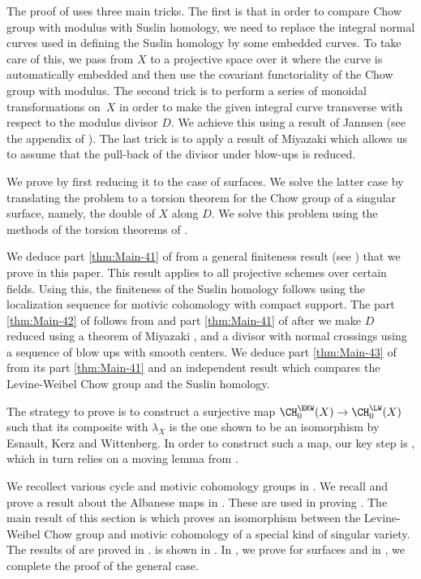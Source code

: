 The proof of  uses three main tricks. The first is
that in order to compare Chow group with modulus with Suslin homology,
we need to replace the integral normal curves used in defining the
Suslin homology by some embedded curves. To take care of this,
we pass from $X$ to a projective space over it where the curve is automatically
embedded and then use the covariant functoriality of the Chow group with
modulus. The second trick is to perform a series of monoidal transformations on~$X$ in order to make the given integral curve transverse with respect to
the modulus divisor $D$. We achieve this using a result of
Jannsen (see the appendix of \cite{SaitoSatoAnnals}).
The last trick is to apply a result of Miyazaki \cite{Miyazaki}
which allows us to assume that the pull-back of the divisor under blow-ups is reduced.

We prove  by first reducing it to the case of surfaces.
We solve the latter case by translating the problem to a
torsion theorem for the Chow group of a singular surface, namely, the double of
$X$ along $D$. We solve this problem using the methods of the torsion theorems
of \cite{Krishna-2}.

We deduce part \eqref{thm:Main-41} of  from a general finiteness result
(see ) that we prove in this paper.
This result applies to all projective schemes over certain fields.
Using this, the finiteness of the Suslin homology follows using the
localization sequence for motivic cohomology with compact support.
The part \eqref{thm:Main-42} of  follows from
 and part \eqref{thm:Main-41} of  after we make
$D$ reduced using a theorem of Miyazaki \cite{Miyazaki}, and a divisor with
normal crossings using a sequence of blow ups with smooth centers.
We deduce part \eqref{thm:Main-43} of  from its part \eqref{thm:Main-41} and
an independent result  which compares the Levine-Weibel
Chow group and the Suslin homology.

The strategy to prove  is to construct a surjective map
$\CH^{\EKW}_0(X) \to \CH^{\LW}_0(X)$ such that its composite with
$\lambda_X$ is the one shown to be an isomorphism by Esnault, Kerz and
Wittenberg. In order to construct such a map, our key step is
, which in turn relies on a moving lemma from
\cite{BK}.

We recollect various cycle and motivic cohomology groups in
. We recall and prove a result about the
Albanese maps in . These are used in
proving . The main result of this section is
 which proves an isomorphism between
the Levine-Weibel Chow group and motivic cohomology of a
special kind of singular variety.
The results of  are proved in
.  is shown in .
In , we prove
 for surfaces and in ,
we complete the proof of the general case.

